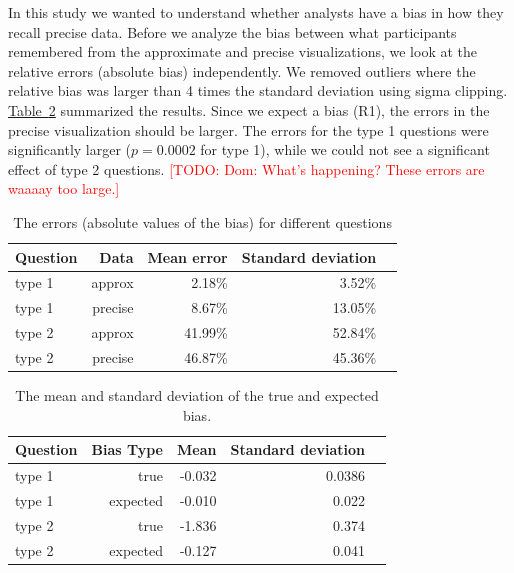 \documentclass[10pt,journal,compsoc]{IEEEtran}
\newcommand{\tabref}[1]{\hyperref[#1]{Table~\ref*{#1}}}
\newcommand{\note}[2]{\textcolor{#1}{[#2]}}
\newcommand{\todo}[1]{\note{red}{TODO: #1}}
\begin{document}
In this study we wanted to understand whether analysts have a bias in how they recall precise data.
Before we analyze the bias between what participants remembered from the approximate and precise visualizations, we look at the relative errors (absolute bias) independently.
We removed outliers where the relative bias was larger than 4 times the standard deviation using sigma clipping.
\tabref{table_errors} summarized the results.
Since we expect a bias (R1), the errors in the precise visualization should be larger.
The errors for the type 1 questions were significantly larger ($p=0.0002$ for type 1), while we could not see a significant effect of type 2 questions.  \todo{Dom: What's happening? These errors are waaaay too large.}

\begin{table}[!t]
\renewcommand{\arraystretch}{1.3}
\caption{The errors (absolute values of the bias) for different questions}
\label{table_errors}
\centering
\begin{tabular}{|l||r|r|r|r|}
\hline
Question & Data        & Mean error & Standard deviation \\ \hline
\hline
type 1   & approx      & 2.18\%     & 3.52\%             \\ \hline
type 1   & precise     & 8.67\%     & 13.05\%            \\ \hline
type 2   & approx      & 41.99\%    & 52.84\%            \\ \hline
type 2   & precise     & 46.87\%    & 45.36\%            \\ \hline
\end{tabular}
\end{table}


\begin{table}[!t]
\renewcommand{\arraystretch}{1.3}
\caption{The mean and standard deviation of the true and expected bias.}
\label{table_errors}
\centering
\begin{tabular}{|l||r|r|r|r|}
\hline
Question & Bias Type  & Mean  & Standard deviation \\ \hline
\hline
type 1   & true      & -0.032 & 0.0386 \\ \hline
type 1   & expected  & -0.010 & 0.022  \\ \hline
type 2   & true      & -1.836 & 0.374  \\ \hline
type 2   & expected  & -0.127 & 0.041  \\ \hline
\end{tabular}
\end{table}
\end{document}

